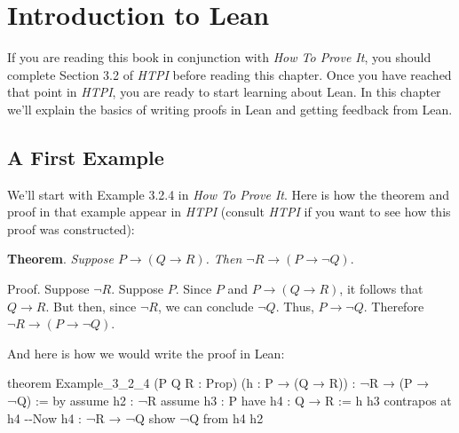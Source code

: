 \documentclass[
  letterpaper,
  DIV=11,
  numbers=noendperiod]{scrreprt}
\newenvironment{Shaded}{\begin{snugshade}}{\end{snugshade}}
\newcommand{\CommentTok}[1]{\textcolor[rgb]{0.37,0.37,0.37}{#1}}
\newcommand{\KeywordTok}[1]{\textcolor[rgb]{0.00,0.23,0.31}{#1}}
\newcommand{\NormalTok}[1]{\textcolor[rgb]{0.00,0.23,0.31}{#1}}
\renewcommand{\KeywordTok}[1]{\textcolor[HTML]{0000FF}{#1}}
\renewcommand{\CommentTok}[1]{\textcolor[HTML]{008000}{#1}}
\begin{document}

\hypertarget{introduction-to-lean}{%
\chapter*{Introduction to Lean}\label{introduction-to-lean}}

If you are reading this book in conjunction with \emph{How To Prove It},
you should complete Section 3.2 of \emph{HTPI} before reading this
chapter. Once you have reached that point in \emph{HTPI}, you are ready
to start learning about Lean. In this chapter we'll explain the basics
of writing proofs in Lean and getting feedback from Lean.

\hypertarget{a-first-example}{%
\section*{A First Example}\label{a-first-example}}

We'll start with Example 3.2.4 in \emph{How To Prove It}. Here is how
the theorem and proof in that example appear in \emph{HTPI} (consult
\emph{HTPI} if you want to see how this proof was constructed):

\textbf{Theorem}. \emph{Suppose \(P \to (Q \to R)\). Then
\(\neg R \to (P \to \neg Q)\)}.

Proof. Suppose \(\neg R\). Suppose \(P\). Since \(P\) and
\(P \to (Q \to R)\), it follows that \(Q \to R\). But then, since
\(\neg R\), we can conclude \(\neg Q\). Thus, \(P \to \neg Q\).
Therefore \(\neg R \to (P \to \neg Q)\).

And here is how we would write the proof in Lean:

\begin{Shaded}
\begin{Highlighting}[]
\KeywordTok{theorem}\NormalTok{ Example\_3\_2\_4}
\NormalTok{(P Q R : }\KeywordTok{Prop}\NormalTok{) (h : P → (Q → R)) : ¬R → (P → ¬Q) := }\KeywordTok{by}
  \KeywordTok{assume}\NormalTok{ h2 : ¬R}
  \KeywordTok{assume}\NormalTok{ h3 : P}
  \KeywordTok{have}\NormalTok{ h4 : Q → R := h h3}
  \KeywordTok{contrapos} \KeywordTok{at}\NormalTok{ h4            }\CommentTok{{-}{-}Now h4 : ¬R → ¬Q}
  \KeywordTok{show}\NormalTok{ ¬Q }\KeywordTok{from}\NormalTok{ h4 h2}
\end{Highlighting}
\end{Shaded}
\end{document}
